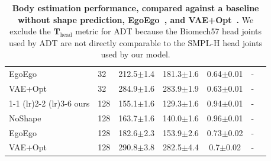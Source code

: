 \begin{table}[t]
\begin{center}
{\begin{tabular}{llccccc}
EgoEgo & 32 & \cellcolor{red!30}212.5\scriptsize{$\pm$1.4} & \cellcolor{red!30}181.3\scriptsize{$\pm$1.6} & \cellcolor{red!30}0.64\scriptsize{$\pm$0.01} & -\\
VAE+Opt & 32 & 284.9\scriptsize{$\pm$1.6} & 283.9\scriptsize{$\pm$1.9} & 0.63\scriptsize{$\pm$0.01} & -\\
\cmidrule(lr){1-1} \cmidrule(lr){2-2} \cmidrule(lr){3-6}
ours & 128 & \cellcolor{yellow!30}155.1\scriptsize{$\pm$1.6} & \cellcolor{yellow!30}129.3\scriptsize{$\pm$1.6} & \cellcolor{orange!30}0.94\scriptsize{$\pm$0.01} & -\\
NoShape & 128 & \cellcolor{orange!30}163.7\scriptsize{$\pm$1.6} & \cellcolor{orange!30}140.0\scriptsize{$\pm$1.6} & \cellcolor{yellow!30}0.96\scriptsize{$\pm$0.01} & -\\
EgoEgo & 128 & \cellcolor{red!30}182.6\scriptsize{$\pm$2.3} & \cellcolor{red!30}153.9\scriptsize{$\pm$2.6} & \cellcolor{red!30}0.73\scriptsize{$\pm$0.02} & -\\
VAE+Opt & 128 & 290.8\scriptsize{$\pm$3.8} & 282.5\scriptsize{$\pm$4.4} & 0.7\scriptsize{$\pm$0.02} & -\\
\bottomrule
\end{tabular}
}
\end{center}
        \vspace{-0.3em}
\caption{
            \textbf{Body estimation performance, compared against a baseline without shape prediction, EgoEgo~\cite{li2023egoego}, and VAE+Opt~\cite{rempe2021humor,ye2023slahmr}.}
            We exclude the $\textbf{T}_\text{head}$ metric for ADT because the Biomech57 head joints used by ADT are not directly comparable to the SMPL-H head joints used by our model.
        }
\label{table:quant_amass_rich_adt}
    \vspace{-1em}
\end{table}
